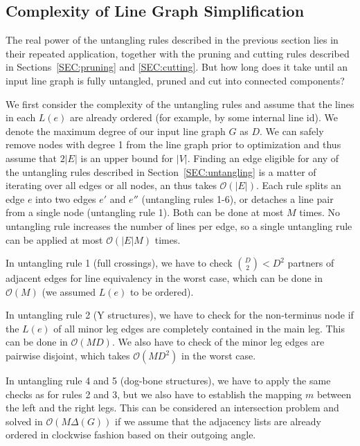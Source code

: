 \documentclass[format=acmsmall, review=false, screen=true]{acmart}
\begin{document}
\subsection{Complexity of Line Graph Simplification}

The real power of the untangling rules described in the previous section lies in their repeated application, together with the pruning and cutting rules described in Sections~\ref{SEC:pruning} and \ref{SEC:cutting}.
But how long does it take until an input line graph is fully untangled, pruned and cut into connected components?

We first consider the complexity of the untangling rules and assume that the lines in each $L(e)$ are already ordered (for example, by some internal line id).
We denote the maximum degree of our input line graph $G$ as $D$.
We can safely remove nodes with degree 1 from the line graph prior to optimization and thus assume that $2|E|$ is an upper bound for $|V|$.
Finding an edge eligible for any of the untangling rules described in Section~\ref{SEC:untangling} is a matter of iterating over all edges or all nodes, an thus takes $\mathcal{O}(|E|)$.
Each rule splits an edge $e$ into two edges $e'$ and $e''$ (untangling rules 1-6), or detaches a line pair from a single node (untangling rule 1).
Both can be done at most $M$ times.
No untangling rule increases the number of lines per edge, so a single untangling rule can be applied at most $\mathcal{O}(|E|M)$ times.

In untangling rule 1 (full crossings), we have to check ${D \choose 2} < D^2$ partners of adjacent edges for line equivalency in the worst case, which can be done in $\mathcal{O}(M)$ (we assumed $L(e)$ to be ordered).


In untangling rule 2 (Y structures), we have to check for the non-terminus node if the $L(e)$ of all minor leg edges are completely contained in the main leg.
This can be done in $\mathcal{O}(MD)$.
We also have to check of the minor leg edges are pairwise disjoint, which takes $\mathcal{O}(MD^2)$ in the worst case. 


In untangling rule 4 and 5 (dog-bone structures), we have to apply the same checks as for rules 2 and 3, but we also have to establish the mapping $m$ between the left and the right legs.
This can be considered an intersection problem and solved in $\mathcal{O}(M\Delta(G))$ if we assume that the adjacency lists are already ordered in clockwise fashion based on their outgoing angle.
\end{document}
